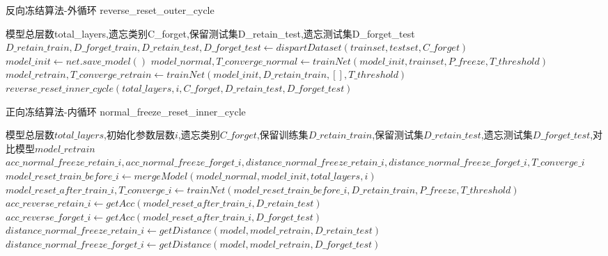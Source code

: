 \begin{algorithm}
	\renewcommand{\algorithmicrequire}{\textbf{Input:}}
	\renewcommand{\algorithmicensure}{\textbf{Output:}}
	\caption{反向冻结算法-外循环 reverse\_reset\_outer\_cycle}
	\label{algorithm:reverse_reset_outer_cycle}
	\begin{algorithmic}[1]
        \REQUIRE 模型总层数total\_layers,遗忘类别C\_forget,保留测试集D\_retain\_test,遗忘测试集D\_forget\_test
        \ENSURE  
        \STATE $D\_retain\_train, D\_forget\_train, D\_retain\_test, D\_forget\_test \gets dispartDataset(trainset, testset, C\_forget)$
        \STATE $model\_init \gets net.save\_model()$
        \STATE $model\_normal,T\_converge\_normal \gets trainNet(model\_init, trainset, P\_freeze, T\_threshold)$
        \STATE $model\_retrain,T\_converge\_retrain \gets trainNet(model\_init, D\_retain\_train, [], T\_threshold)$
            \STATE $reverse\_reset\_inner\_cycle(total\_layers, i, C\_forget, D\_retain\_test, D\_forget\_test)$
        \ENDFOR
	\end{algorithmic}  
\end{algorithm}

\begin{algorithm}
	\renewcommand{\algorithmicrequire}{\textbf{Input:}}
	\renewcommand{\algorithmicensure}{\textbf{Output:}}
	\caption{正向冻结算法-内循环 normal\_freeze\_reset\_inner\_cycle}
	\label{algorithm:normal_freeze_reset_inner_cycle}
	\begin{algorithmic}[1]
        \REQUIRE 模型总层数$total\_layers$,初始化参数层数$i$,遗忘类别$C\_forget$,保留训练集$D\_retain\_train$,保留测试集$D\_retain\_test$,遗忘测试集$D\_forget\_test$,对比模型$model\_retrain$
        \ENSURE  $acc\_normal\_freeze\_retain\_i,acc\_normal\_freeze\_forget\_i,distance\_normal\_freeze\_retain\_i,distance\_normal\_freeze\_forget\_i,T\_converge\_i$
		\STATE $model\_reset\_train\_before\_i \gets mergeModel(model\_normal, model\_init, total\_layers, i)$
        \STATE $model\_reset\_after\_train\_i,T\_converge\_i \gets trainNet(model\_reset\_train\_before\_i , D\_retain\_train, P\_freeze, T\_threshold)$
        \STATE $acc\_reverse\_retain\_i \gets getAcc(model\_reset\_after\_train\_i, D\_retain\_test)$
        \STATE $acc\_reverse\_forget\_i  \gets getAcc(model\_reset\_after\_train\_i, D\_forget\_test)$
        \STATE $distance\_normal\_freeze\_retain\_i \gets getDistance(model, model\_retrain, D\_retain\_test)$
        \STATE $distance\_normal\_freeze\_forget\_i \gets getDistance(model, model\_retrain, D\_forget\_test)$
	\end{algorithmic}  
\end{algorithm}

